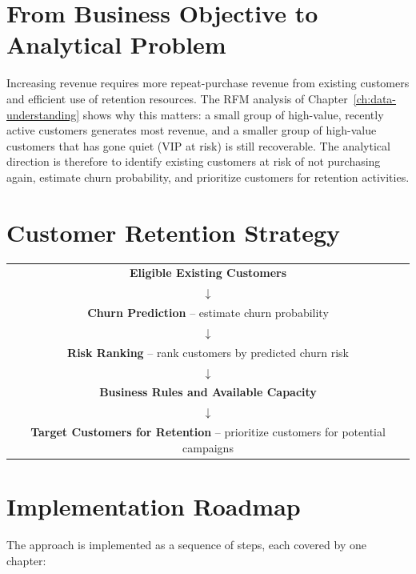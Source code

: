 \section{From Business Objective to Analytical Problem}
\label{sec:2-7}

Increasing revenue requires more repeat-purchase revenue from existing customers and efficient use of retention resources. The RFM analysis of Chapter~\ref{ch:data-understanding} shows why this matters: a small group of high-value, recently active customers generates most revenue, and a smaller group of high-value customers that has gone quiet (VIP at risk) is still recoverable. The analytical direction is therefore to identify existing customers at risk of not purchasing again, estimate churn probability, and prioritize customers for retention activities.

\section{Customer Retention Strategy}
\label{sec:2-8}

\begin{center}
\begin{tabular}{@{}c@{}}
    \textbf{Eligible Existing Customers} \\
    $\downarrow$ \\
    \textbf{Churn Prediction} -- estimate churn probability \\
    $\downarrow$ \\
    \textbf{Risk Ranking} -- rank customers by predicted churn risk \\
    $\downarrow$ \\
    \textbf{Business Rules and Available Capacity} \\
    $\downarrow$ \\
    \textbf{Target Customers for Retention} -- prioritize customers for potential campaigns \\
\end{tabular}
\end{center}

\section{Implementation Roadmap}
\label{sec:2-9}

The approach is implemented as a sequence of steps, each covered by one chapter:

